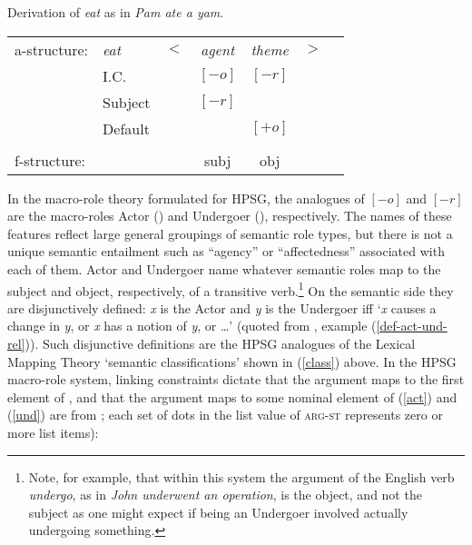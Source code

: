  \begin{exe}
\ex\label{yam}{Derivation of \textit{eat} as in \textit{Pam ate a yam}.\\
\begin{tabular}[t]{@{}lllccll}
a-structure: &{\it eat}& $<$& \textit{agent} & \textit{theme}   & $>$ & \\
             & I.C.      &    & $[-o]$ & $[-r]$   &   & \\
             &  Subject     &    & $[-r]$ &            &              & \\
             &  Default     &    &     & $[+o]$   &   & \\
             &       &    &\vline    & \vline &    & \\
f-structure: &       &    &{\sc subj} &{\sc obj}  &   &
\end{tabular}
  }
\end{exe}

\noindent
In the macro-role theory formulated for HPSG, the analogues of $[-o]$ and $[-r]$ are the macro-roles Actor () and Undergoer (), respectively.  The names of these features reflect large general groupings of semantic role types, but there is not a unique semantic entailment such as ``agency'' or ``affectedness'' associated with each of them.  Actor  and Undergoer  name whatever semantic roles map to the subject and object, respectively, of a transitive verb.\footnote{Note, for example, that within this system the  argument of the English verb \textit{undergo}, as in \textit{John underwent an operation}, is the object, and not the subject as one might expect if being an Undergoer involved actually undergoing something.}  On the semantic side they are disjunctively defined: \textit{x} is the Actor and \textit{y} is the Undergoer iff `\textit{x} causes a change in \textit{y}, or \textit{x} has a notion of \textit{y}, or \ldots ' (quoted from , example (\ref{def-act-und-rel})).  Such disjunctive definitions are the HPSG analogues of the Lexical Mapping Theory `semantic classifications' shown in (\ref{class}) above.   In the HPSG macro-role system, linking constraints dictate that the  argument maps to the first element of , and that the  argument maps to some nominal element of  (\ref{act}) and (\ref{und}) are from ; 
each set of dots in the list value of \textsc{arg-st} represents zero or more list items):

